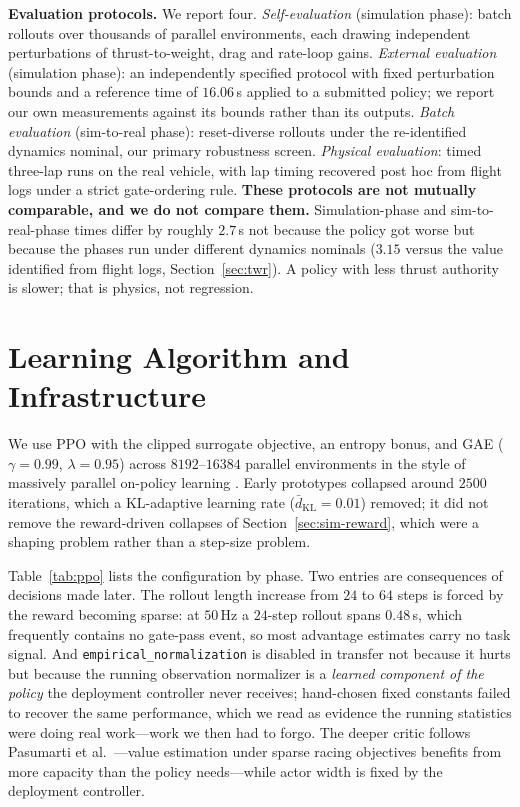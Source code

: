 \documentclass[10pt, twocolumn]{article}
\newcommand{\code}[1]{\texttt{\small #1}}
\begin{document}
\textbf{Evaluation protocols.} We report four. \emph{Self-evaluation}
(simulation phase): batch rollouts over thousands of parallel environments,
each drawing independent perturbations of thrust-to-weight, drag and rate-loop
gains. \emph{External evaluation} (simulation phase): an independently
specified protocol with fixed perturbation bounds and a reference time of
$16.06$\,s applied to a submitted policy; we report our own measurements
against its bounds rather than its outputs. \emph{Batch evaluation}
(sim-to-real phase): reset-diverse rollouts under the re-identified dynamics
nominal, our primary robustness screen. \emph{Physical evaluation}: timed
three-lap runs on the real vehicle, with lap timing recovered post hoc from
flight logs under a strict gate-ordering rule. \textbf{These protocols are not
mutually comparable, and we do not compare them.} Simulation-phase and
sim-to-real-phase times differ by roughly $2.7$\,s not because the policy got
worse but because the phases run under different dynamics nominals ($3.15$
versus the value identified from flight logs, Section~\ref{sec:twr}). A policy
with less thrust authority is slower; that is physics, not regression.

\section{Learning Algorithm and Infrastructure}

We use PPO \cite{schulman2017} with the clipped surrogate objective, an entropy
bonus, and GAE \cite{schulman2016} ($\gamma = 0.99$, $\lambda = 0.95$) across
$8192$--$16384$ parallel environments in the style of massively parallel
on-policy learning \cite{rudin2022}. Early prototypes collapsed around $2500$
iterations, which a KL-adaptive learning rate ($\bar{d}_{\mathrm{KL}} = 0.01$)
removed; it did not remove the reward-driven collapses of
Section~\ref{sec:sim-reward}, which were a shaping problem rather than a
step-size problem.

Table~\ref{tab:ppo} lists the configuration by phase. Two entries are
consequences of decisions made later. The rollout length increase from $24$ to
$64$ steps is forced by the reward becoming sparse: at $50$\,Hz a $24$-step
rollout spans $0.48$\,s, which frequently contains no gate-pass event, so most
advantage estimates carry no task signal. And \code{empirical\_normalization}
is disabled in transfer not because it hurts but because the running
observation normalizer is a \emph{learned component of the policy} the
deployment controller never receives; hand-chosen fixed constants failed to
recover the same performance, which we read as evidence the running statistics
were doing real work---work we then had to forgo. The deeper critic follows
Pasumarti et al.\ \cite{pasumarti2025}---value estimation under sparse racing
objectives benefits from more capacity than the policy needs---while actor
width is fixed by the deployment controller.
\end{document}
